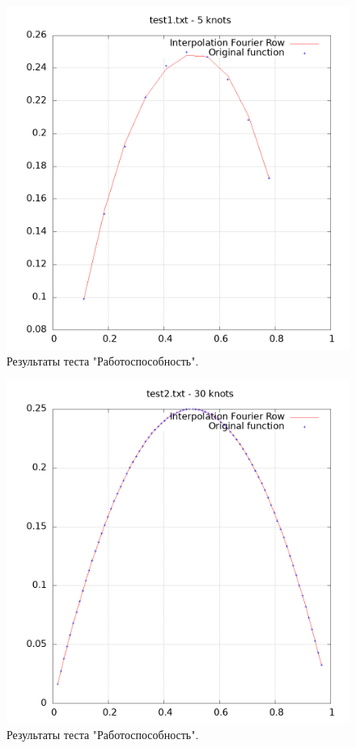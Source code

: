 \documentclass[14pt,a4paper]{extarticle}
\newcommand{\1}{\mathbbm{1}}
\begin{document}
    \begin{figure}
        \centering
        \includegraphics[scale=0.5]{Images/test1.txt.png}
        \caption{Результаты теста "Работоспособность".}
    \end{figure}
    \begin{figure}
        \centering
        \includegraphics[scale=0.5]{Images/test2.txt.png}
        \caption{Результаты теста "Работоспособность".}
    \end{figure}
\end{document}
